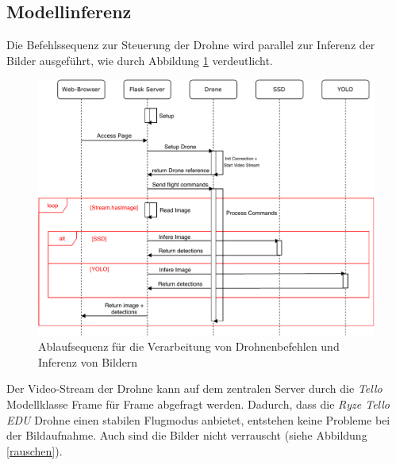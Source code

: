 \subsection*{Modellinferenz}

Die Befehlssequenz zur Steuerung der Drohne wird parallel zur Inferenz der Bilder ausgeführt, wie durch Abbildung \ref{sequence_diagram} verdeutlicht.

\begin{figure}[H]
	\begin{center}
		\includegraphics[width=14cm]{Bilder/sequence_diagram.pdf}
		\caption[Ablaufsequenz für die Verarbeitung von Drohnenbefehlen und Inferenz von Bildern]{Ablaufsequenz für die Verarbeitung von Drohnenbefehlen und Inferenz von Bildern}
		\label{sequence_diagram}
	\end{center}
\end{figure}

Der Video-Stream der Drohne kann auf dem zentralen Server durch die \textit{Tello} Modellklasse Frame für Frame abgefragt werden. Dadurch, dass die \textit{Ryze Tello EDU} Drohne einen stabilen Flugmodus anbietet, entstehen keine Probleme bei der Bildaufnahme. Auch sind die Bilder nicht verrauscht (siehe Abbildung \ref{rauschen}).

